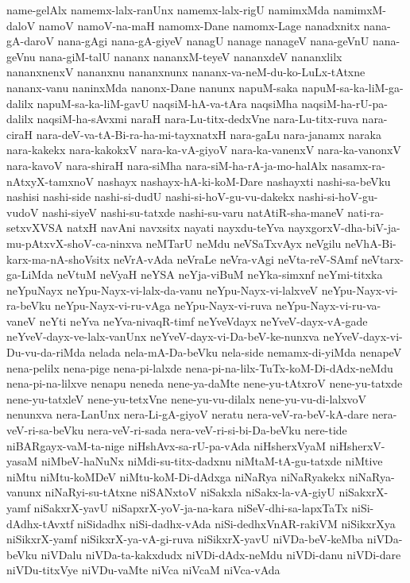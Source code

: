 {name-gelAlx
namemx-lalx-ranUnx
namemx-lalx-rigU
namimxMda
namimxM-daloV
namoV
namoV-na-maH‌
namomx-Dane
namomx-Lage
nanadxnitx
nana-gA-daroV
nana-gAgi
nana-gA-giyeV
nanagU
nanage
nanageV
nana-geVnU
nana-geVnu
nana-giM-talU
nananx
nananxM-teyeV
nananxdeV
nananxlilx
nananxnenxV
nananxnu
nananxnunx
nananx-va-neM-du-ko-LuLx-tAtxne
nananx-vanu
naninxMda
nanonx-Dane
nanunx
napuM-saka
napuM-sa-ka-liM-ga-dalilx
napuM-sa-ka-liM-gavU
naqsiM-hA-va-tAra
naqsiMha
naqsiM-ha-rU-pa-dalilx
naqsiM-ha-sAvxmi
naraH
nara-Lu-titx-dedxVne
nara-Lu-titx-ruva
nara-ciraH
nara-deV-va-tA-Bi-ra-ha-mi-tayxnatxH
nara-gaLu
nara-janamx
naraka
nara-kakekx
nara-kakokxV
nara-ka-vA-giyoV
nara-ka-vanenxV
nara-ka-vanonxV
nara-kavoV
nara-shiraH
nara-siMha
nara-siM-ha-rA-ja-mo-halAlx
nasamx-ra-nAtxyX-tamxnoV
nashayx
nashayx-hA-ki-koM-Dare
nashayxti
nashi-sa-beVku
nashisi
nashi-side
nashi-si-dudU
nashi-si-hoV-gu-vu-dakekx
nashi-si-hoV-gu-vudoV
nashi-siyeV
nashi-su-tatxde
nashi-su-varu
natAtiR-sha-maneV
nati-ra-setxvXVSA
natxH
navAni
navxsitx
nayati
nayxdu-teYva
nayxgorxV-dha-biV-ja-mu-pAtxvX-shoV-ca-ninxva
neMTarU
neMdu
neVSaTxvAyx
neVgilu
neVhA-Bi-karx-ma-nA-shoVsitx
neVrA-vAda
neVraLe
neVra-vAgi
neVta-reV-SAmf
neVtarx-ga-LiMda
neVtuM
neVyaH
neYSA
neYja-viBuM
neYka-simxnf
neYmi-titxka
neYpuNayx
neYpu-Nayx-vi-lalx-da-vanu
neYpu-Nayx-vi-lalxveV
neYpu-Nayx-vi-ra-beVku
neYpu-Nayx-vi-ru-vAga
neYpu-Nayx-vi-ruva
neYpu-Nayx-vi-ru-va-vaneV
neYti
neYva
neYva-nivaqR-timf
neYveVdayx
neYveV-dayx-vA-gade
neYveV-dayx-ve-lalx-vanUnx
neYveV-dayx-vi-Da-beV-ke-nunxva
neYveV-dayx-vi-Du-vu-da-riMda
nelada
nela-mA-Da-beVku
nela-side
nemamx-di-yiMda
nenapeV
nena-pelilx
nena-pige
nena-pi-lalxde
nena-pi-na-lilx-TuTx-koM-Di-dAdx-neMdu
nena-pi-na-lilxve
nenapu
neneda
nene-ya-daMte
nene-yu-tAtxroV
nene-yu-tatxde
nene-yu-tatxleV
nene-yu-tetxVne
nene-yu-vu-dilalx
nene-yu-vu-di-lalxvoV
nenunxva
nera-LanUnx
nera-Li-gA-giyoV
neratu
nera-veV-ra-beV-kA-dare
nera-veV-ri-sa-beVku
nera-veV-ri-sada
nera-veV-ri-si-bi-Da-beVku
nere-tide
niBARgayx-vaM-ta-nige
niHshAvx-sa-rU-pa-vAda
niHsherxVyaM
niHsherxV-yasaM
niMbeV-haNuNx
niMdi-su-titx-dadxnu
niMtaM-tA-gu-tatxde
niMtive
niMtu
niMtu-koMDeV
niMtu-koM-Di-dAdxga
niNaRya
niNaRyakekx
niNaRya-vanunx
niNaRyi-su-tAtxne
niSANxtoV
niSakxla
niSakx-la-vA-giyU
niSakxrX-yamf
niSakxrX-yavU
niSapxrX-yoV-ja-na-kara
niSeV-dhi-sa-lapxTaTx
niSi-dAdhx-tAvxtf
niSidadhx
niSi-dadhx-vAda
niSi-dedhxVnAR-rakiVM
niSikxrXya
niSikxrX-yamf
niSikxrX-ya-vA-gi-ruva
niSikxrX-yavU
niVDa-beV-keMba
niVDa-beVku
niVDalu
niVDa-ta-kakxdudx
niVDi-dAdx-neMdu
niVDi-danu
niVDi-dare
niVDu-titxVye
niVDu-vaMte
niVca
niVcaM
niVca-vAda
}

